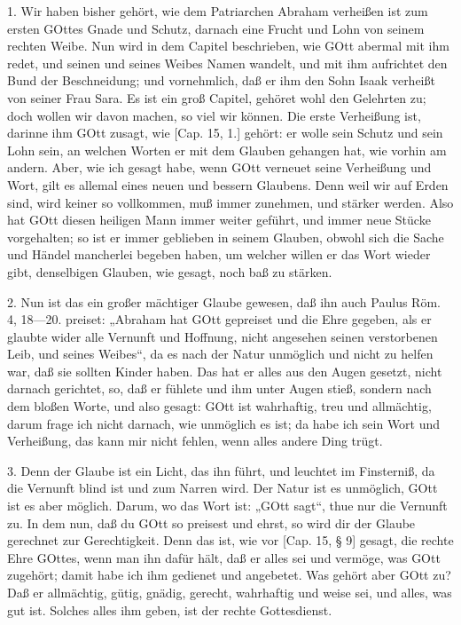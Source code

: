 1. Wir haben bisher gehört, wie dem Patriarchen Abraham verheißen ist zum ersten GOttes Gnade und Schutz, darnach eine Frucht und Lohn von seinem rechten Weibe. Nun wird in dem Capitel beschrieben, wie GOtt abermal mit ihm redet, und seinen und seines Weibes Namen wandelt, und mit ihm aufrichtet den Bund der Beschneidung; und vornehmlich, daß er ihm den Sohn Isaak verheißt von seiner Frau Sara. Es ist ein groß Capitel, gehöret wohl den Gelehrten zu; doch wollen wir davon machen, so viel wir können. Die erste Verheißung ist, darinne ihm GOtt zusagt, wie [Cap. 15, 1.] gehört: er wolle sein Schutz und sein Lohn sein, an welchen Worten er mit dem Glauben gehangen hat, wie vorhin am andern. Aber, wie ich gesagt habe, wenn GOtt verneuet seine Verheißung und Wort, gilt es allemal eines neuen und bessern Glaubens. Denn weil wir auf Erden sind, wird keiner so vollkommen, muß immer zunehmen, und stärker werden. Also hat GOtt diesen heiligen Mann immer weiter geführt, und immer neue Stücke vorgehalten; so ist er immer geblieben in seinem Glauben, obwohl sich die Sache und Händel mancherlei begeben haben, um welcher willen er das Wort wieder gibt, denselbigen Glauben, wie gesagt, noch baß zu stärken.

2. Nun ist das ein großer mächtiger Glaube gewesen, daß ihn auch Paulus Röm. 4, 18—20. preiset: „Abraham hat GOtt gepreiset und die Ehre gegeben, als er glaubte wider alle Vernunft und Hoffnung, nicht angesehen seinen verstorbenen Leib, und seines Weibes“, da es nach der Natur unmöglich und nicht zu helfen war, daß sie sollten Kinder haben. Das hat er alles aus den Augen gesetzt, nicht darnach gerichtet, so, daß er fühlete und ihm unter Augen stieß, sondern nach dem bloßen Worte, und also gesagt: GOtt ist wahrhaftig, treu und allmächtig, darum frage ich nicht darnach, wie unmöglich es ist; da habe ich sein Wort und Verheißung, das kann mir nicht fehlen, wenn alles andere Ding trügt.



3. Denn der Glaube ist ein Licht, das ihn führt, und leuchtet im Finsterniß, da die Vernunft blind ist und zum Narren wird. Der Natur ist es unmöglich, GOtt ist es aber möglich. Darum, wo das Wort ist: „GOtt sagt“, thue nur die Vernunft zu. In dem nun, daß du GOtt so preisest und ehrst, so wird dir der Glaube gerechnet zur Gerechtigkeit. Denn das ist, wie vor [Cap. 15, § 9] gesagt, die rechte Ehre GOttes, wenn man ihn dafür hält, daß er alles sei und vermöge, was GOtt zugehört; damit habe ich ihm gedienet und angebetet. Was gehört aber GOtt zu? Daß er allmächtig, gütig, gnädig, gerecht, wahrhaftig und weise sei, und alles, was gut ist. Solches alles ihm geben, ist der rechte Gottesdienst.

